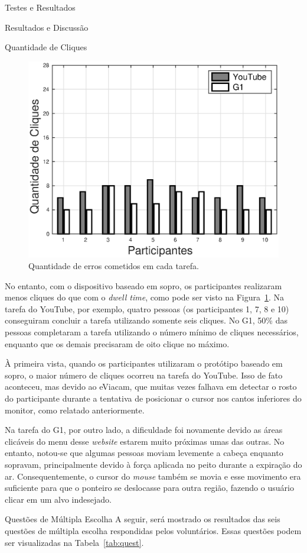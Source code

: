 \begin{chapter}{Testes e Resultados}
\begin{section}{Resultados e Discussão}
\begin{subsection}{Quantidade de Cliques}
\begin{figure}[!h]
	\centering
	\includegraphics[width=0.7\linewidth]{fig/PuffClicks}
	\caption{Quantidade de erros cometidos em cada tarefa.}
	\label{fig:puffclicks}
\end{figure}

No entanto, com o dispositivo baseado em sopro, os participantes realizaram
menos cliques do que com o \textit{dwell time}, como pode ser visto na
Figura~\ref{fig:puffclicks}. Na tarefa do YouTube, por exemplo, quatro pessoas
(os participantes 1, 7, 8 e 10) conseguiram concluir a tarefa utilizando somente
seis cliques. No G1, 50\% das pessoas completaram a tarefa utilizando o número
mínimo de cliques necessários, enquanto que os demais precisaram de oito clique
no máximo.

À primeira vista, quando os participantes utilizaram o protótipo baseado em
sopro, o maior número de cliques ocorreu na tarefa do YouTube. Isso de fato
aconteceu, mas devido ao eViacam, que muitas vezes falhava em detectar o rosto
do participante durante a tentativa de posicionar o cursor nos cantos inferiores
do monitor, como relatado anteriormente.
  
Na tarefa do G1, por outro lado, a dificuldade foi novamente devido as áreas
clicáveis do menu desse \textit{website} estarem muito próximas umas das
outras. No entanto, notou-se que algumas pessoas moviam levemente a cabeça
enquanto sopravam, principalmente devido à força aplicada no peito durante a
expiração do ar. Consequentemente, o cursor do \textit{mouse} também se movia e
esse movimento era suficiente para que o ponteiro se deslocasse para outra
região, fazendo o usuário clicar em um alvo indesejado.
\end{subsection}

\begin{subsection}{Questões de Múltipla Escolha}
A seguir, será mostrado os resultados das seis questões de múltipla escolha 
respondidas pelos voluntários. Essas questões podem ser visualizadas na
Tabela~\ref{tab:quest}.


\end{subsection}
\end{section}
\end{chapter}
